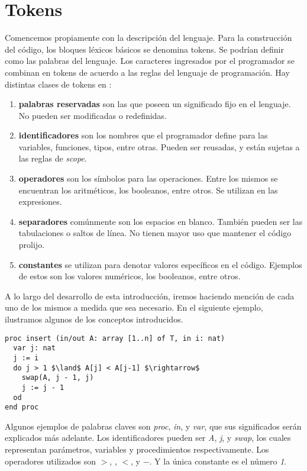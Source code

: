 \documentclass{article}
\begin{document}
\section{Tokens}

Comencemos propiamente con la descripción del lenguaje.
Para la construcción del código, los bloques léxicos básicos se denomina tokens.
Se podrían definir como las palabras del lenguaje.
Los caracteres ingresados por el programador se combinan en tokens de acuerdo a las reglas del lenguaje de programación.
Hay distintas clases de tokens en \Lang:

\begin{enumerate}
\item \textbf{palabras reservadas} son las que poseen un significado fijo en el lenguaje.
No pueden ser modificadas o redefinidas.
\item \textbf{identificadores} son los nombres que el programador define para las variables, funciones, tipos, entre otras.
Pueden ser reusadas, y están sujetas a las reglas de \textit{scope}.
\item \textbf{operadores} son los símbolos para las operaciones.
Entre los mismos se encuentran los aritméticos, los booleanos, entre otros.
Se utilizan en las expresiones.
\item \textbf{separadores} comúnmente son los espacios en blanco.
También pueden ser las tabulaciones o saltos de línea.
No tienen mayor uso que mantener el código prolijo.
\item \textbf{constantes} se utilizan para denotar valores específicos en el código.
Ejemplos de estos son los valores numéricos, los booleanos, entre otros.
\end{enumerate}

A lo largo del desarrollo de esta introducción, iremos haciendo mención de cada uno de los mismos a medida que sea necesario.
En el siguiente ejemplo, ilustramos algunos de los conceptos introducidos.

\begin{lstlisting}
proc insert (in/out A: array [1..n] of T, in i: nat)
  var j: nat
  j := i
  do j > 1 $\land$ A[j] < A[j-1] $\rightarrow$
    swap(A, j - 1, j)
    j := j - 1
  od
end proc
\end{lstlisting}

Algunos ejemplos de palabras claves son \textit{proc}, \textit{in}, y \textit{var}, que sus significados serán explicados más adelante.
Los identificadores pueden ser \textit{A}, \textit{j}, y \textit{swap}, los cuales representan parámetros, variables y procedimientos respectivamente.
Los operadores utilizados son $>$, \sand, $<$, y $-$.
Y la única constante es el número \textit{1}.
\end{document}
